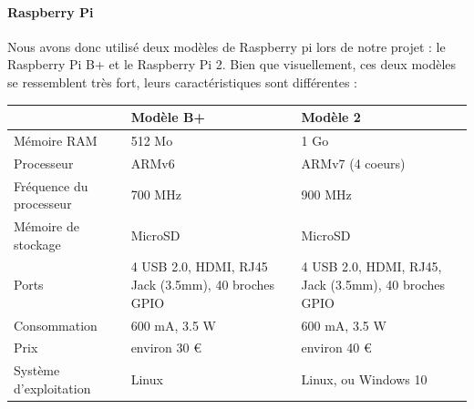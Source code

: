 \documentclass[12pt,a4paper]{report}
\begin{document}
\paragraph{Raspberry Pi} Nous avons donc utilisé deux modèles de Raspberry pi lors de notre projet : le Raspberry Pi B+ et le Raspberry Pi 2. 
Bien que visuellement, ces deux modèles se ressemblent très fort, leurs caractéristiques sont différentes :

\begin{tabular}{l|p{4.5 cm}|p{4.5 cm}}
 & Modèle B+ & Modèle 2 \\ 
\hline 
Mémoire RAM & 512 Mo & 1 Go \\ 
Processeur & ARMv6 & ARMv7 (4 coeurs) \\
Fréquence du processeur & 700 MHz & 900 MHz \\
Mémoire de stockage & MicroSD & MicroSD \\
Ports & 4 USB 2.0, HDMI, RJ45 \newline Jack (3.5mm), 40 broches GPIO & 4 USB 2.0, HDMI, RJ45, Jack (3.5mm), 40 broches GPIO \\
Consommation & 600 mA, 3.5 W & 600 mA, 3.5 W \\
Prix & environ 30 \euro & environ 40 \euro \\
Système d'exploitation & Linux & Linux, ou Windows 10
\end{tabular}
\end{document}
